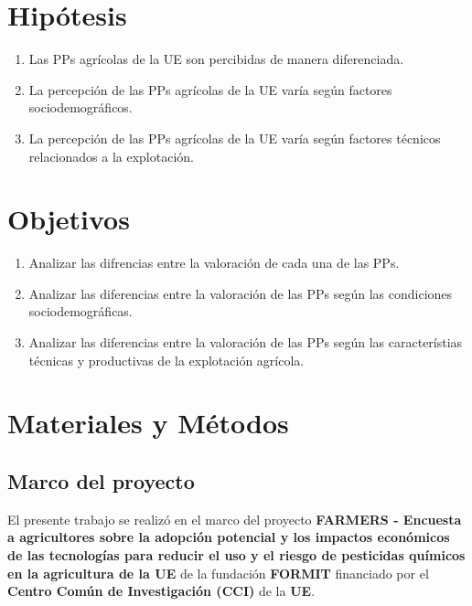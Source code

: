 \documentclass[a4paper, nobind]{templates/ociamthesis}
\begin{document}
\hypertarget{hipotesis}{%
\chapter{Hipótesis}\label{hipotesis}}

\begin{enumerate}
\def\labelenumi{\arabic{enumi}.}
\item
  Las PPs agrícolas de la UE son percibidas de manera diferenciada.
\item
  La percepción de las PPs agrícolas de la UE varía según factores sociodemográficos.
\item
  La percepción de las PPs agrícolas de la UE varía según factores técnicos relacionados a la explotación.
\end{enumerate}

\hypertarget{objetivos}{%
\chapter{Objetivos}\label{objetivos}}

\begin{enumerate}
\def\labelenumi{\arabic{enumi}.}
\item
  Analizar las difrencias entre la valoración de cada una de las PPs.
\item
  Analizar las diferencias entre la valoración de las PPs según las condiciones sociodemográficas.
\item
  Analizar las diferencias entre la valoración de las PPs según las característias técnicas y productivas de la explotación agrícola.
\end{enumerate}

\hypertarget{mat-met}{%
\chapter{Materiales y Métodos}\label{mat-met}}

\hypertarget{marco-del-proyecto}{%
\section{Marco del proyecto}\label{marco-del-proyecto}}

El presente trabajo se realizó en el marco del proyecto \textbf{FARMERS - Encuesta a agricultores sobre la adopción potencial y los impactos económicos de las tecnologías para reducir el uso y el riesgo de pesticidas químicos en la agricultura de la UE} de la fundación \textbf{FORMIT} financiado por el \textbf{Centro Común de Investigación (CCI)} de la \textbf{UE}.
\end{document}
